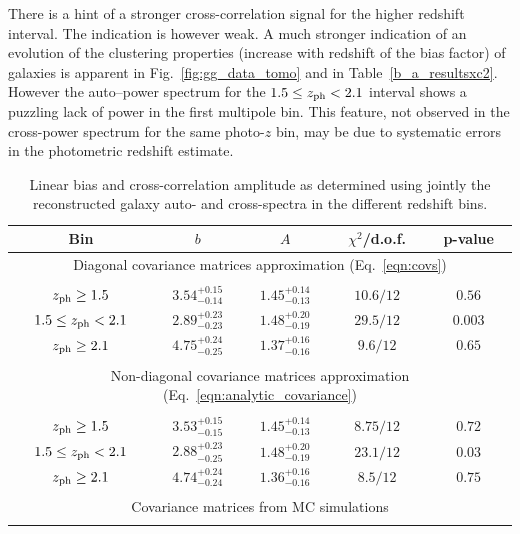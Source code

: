 There is  a hint of a stronger cross-correlation signal for the higher redshift interval. The indication is however weak. A much stronger indication of an evolution of the clustering properties (increase with redshift of the bias factor) of galaxies is apparent in Fig.~\eqref{fig:gg_data_tomo} and in Table~\eqref{b_a_resultsxc2}. However the auto--power spectrum for the $1.5 \le z_{\rm{ph}} < 2.1$ interval shows a puzzling lack of power in the first multipole bin. This feature, not observed in the cross-power spectrum for the same photo-$z$ bin, may be due to systematic errors in the photometric redshift estimate.
%
\begin{table}[t]
\centering
\caption{Linear bias and cross-correlation amplitude as determined using jointly the reconstructed galaxy auto- and cross-spectra in the different redshift bins.\label{b_a_resultsxc2}}
\begin{threeparttable}
\begin{tabular}{ccccc}
\toprule
\midrule
Bin & $b$ & $A$ & $\chi^2$/d.o.f. & p-value\\
\midrule
\multicolumn{5}{c}{Diagonal covariance matrices approximation (Eq.~\eqref{eqn:covs})}\\
\cline{1-5} \\
$z_{\rm{ph}} \ge 1.5$  & $3.54^{+0.15}_{-0.14}$  &  $1.45^{+0.14}_{-0.13}$ & $10.6/12$ & $0.56$ \\
$1.5 \le z_{\rm{ph}} < 2.1$  & $2.89^{+0.23}_{-0.23}$   &  $1.48^{+0.20}_{-0.19}$  & $29.5/12$ & $0.003$ \\
$z_{\rm{ph}} \ge 2.1$  & $4.75^{+0.24}_{-0.25}$   &  $1.37^{+0.16}_{-0.16}$ & $9.6/12$ & $0.65$ \\
\cline{1-5} \\
\multicolumn{5}{c}{Non-diagonal covariance matrices approximation (Eq.~\eqref{eqn:analytic_covariance})}\\
\cline{1-5} \\
$z_{\rm{ph}} \ge 1.5$  & $3.53^{+0.15}_{-0.15}$  &  $1.45^{+0.14}_{-0.13}$ & $8.75/12$ & $0.72$ \\
$1.5 \le z_{\rm{ph}} < 2.1$  & $2.88^{+0.23}_{-0.25}$   &  $1.48^{+0.20}_{-0.19}$  & $23.1/12$ & $0.03$ \\
$z_{\rm{ph}} \ge 2.1$  & $4.74^{+0.24}_{-0.24}$   &  $1.36^{+0.16}_{-0.16}$ & $8.5/12$ & $0.75$ \\
\cline{1-5} \\
\multicolumn{5}{c}{Covariance matrices from MC simulations}\\
\cline{1-5} \\

\end{tabular}
\end{threeparttable}
\end{table}
